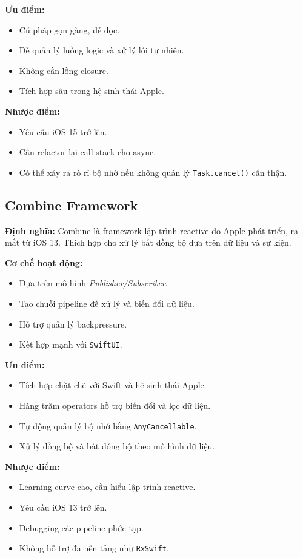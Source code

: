 \textbf{Ưu điểm:}
\begin{itemize}
    \item Cú pháp gọn gàng, dễ đọc.
    \item Dễ quản lý luồng logic và xử lý lỗi tự nhiên.
    \item Không cần lồng closure.
    \item Tích hợp sâu trong hệ sinh thái Apple.
\end{itemize}

\textbf{Nhược điểm:}
\begin{itemize}
    \item Yêu cầu iOS 15 trở lên.
    \item Cần refactor lại call stack cho async.
    \item Có thể xảy ra rò rỉ bộ nhớ nếu không quản lý \texttt{Task.cancel()} cẩn thận.
\end{itemize}

\subsection{Combine Framework}

\textbf{Định nghĩa:} Combine là framework lập trình reactive do Apple phát triển, ra mắt từ iOS 13. Thích hợp cho xử lý bất đồng bộ dựa trên dữ liệu và sự kiện.

\textbf{Cơ chế hoạt động:}
\begin{itemize}
    \item Dựa trên mô hình \textit{Publisher/Subscriber}.
    \item Tạo chuỗi pipeline để xử lý và biến đổi dữ liệu.
    \item Hỗ trợ quản lý backpressure.
    \item Kết hợp mạnh với \texttt{SwiftUI}.
\end{itemize}

\textbf{Ưu điểm:}
\begin{itemize}
    \item Tích hợp chặt chẽ với Swift và hệ sinh thái Apple.
    \item Hàng trăm operators hỗ trợ biến đổi và lọc dữ liệu.
    \item Tự động quản lý bộ nhớ bằng \texttt{AnyCancellable}.
    \item Xử lý đồng bộ và bất đồng bộ theo mô hình dữ liệu.
\end{itemize}

\textbf{Nhược điểm:}
\begin{itemize}
    \item Learning curve cao, cần hiểu lập trình reactive.
    \item Yêu cầu iOS 13 trở lên.
    \item Debugging các pipeline phức tạp.
    \item Không hỗ trợ đa nền tảng như \texttt{RxSwift}.
\end{itemize}
